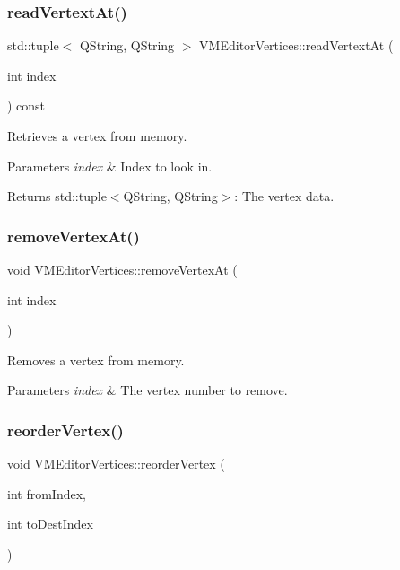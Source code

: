 \subsubsection{\texorpdfstring{readVertextAt()}{readVertextAt()}}
{\footnotesize\ttfamily std\+::tuple$<$ Q\+String, Q\+String $>$ V\+M\+Editor\+Vertices\+::read\+Vertext\+At (\begin{DoxyParamCaption}\item[{int}]{index }\end{DoxyParamCaption}) const}



Retrieves a vertex from memory. 


\begin{DoxyParams}{Parameters}
{\em index} & Index to look in. \\
\hline
\end{DoxyParams}
\begin{DoxyReturn}{Returns}
std\+::tuple$<$\+Q\+String, Q\+String$>$\+: The vertex data. 
\end{DoxyReturn}
\mbox{\label{class_v_m_editor_vertices_a5f1f8f3172ff525863df9bd619d57001}} 
\subsubsection{\texorpdfstring{removeVertexAt()}{removeVertexAt()}}
{\footnotesize\ttfamily void V\+M\+Editor\+Vertices\+::remove\+Vertex\+At (\begin{DoxyParamCaption}\item[{int}]{index }\end{DoxyParamCaption})}



Removes a vertex from memory. 


\begin{DoxyParams}{Parameters}
{\em index} & The vertex number to remove. \\
\hline
\end{DoxyParams}
\mbox{\label{class_v_m_editor_vertices_a33f91a61158bbac2b540ca80ac75eaf1}} 
\subsubsection{\texorpdfstring{reorderVertex()}{reorderVertex()}}
{\footnotesize\ttfamily void V\+M\+Editor\+Vertices\+::reorder\+Vertex (\begin{DoxyParamCaption}\item[{int}]{from\+Index,  }\item[{int}]{to\+Dest\+Index }\end{DoxyParamCaption})}



